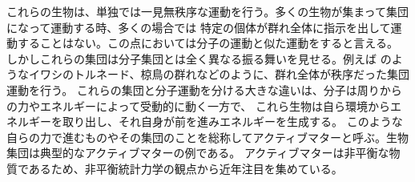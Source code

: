 \documentclass[/Users/ikedahajime/GitHub/reserch/master_report/thesis]{subfiles}
\begin{document}
これらの生物は、単独では一見無秩序な運動を行う。多くの生物が集まって集団になって運動する時、多くの場合では
特定の個体が群れ全体に指示を出して運動することはない。この点においては分子の運動と似た運動をすると言える。
しかしこれらの集団は分子集団とは全く異なる振る舞いを見せる。例えば
のようなイワシのトルネード、椋鳥の群れなどのように、群れ全体が秩序だった集団運動を行う。
これらの集団と分子運動を分ける大きな違いは、分子は周りからの力やエネルギーによって受動的に動く一方で、
これら生物は自ら環境からエネルギーを取り出し、それ自身が前を進みエネルギーを生成する。
このような自らの力で進むものやその集団のことを総称してアクティブマターと呼ぶ。生物集団は典型的なアクティブマターの例である。
アクティブマターは非平衡な物質であるため、非平衡統計力学の観点から近年注目を集めている。%
\end{document}

